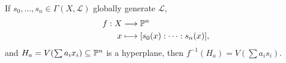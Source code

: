 \begin{remark}
  If $s_0, \dots, s_n \in
  \Gamma(X, \mathcal{L})$
  globally generate $\mathcal{L}$,
  \begin{align*}
    f : X &\longrightarrow \mathbb{P}^n \\
    x &\longmapsto [s_0(x) : \cdots : s_n(x)],
  \end{align*}
  and $H_a = V(\sum a_i x_i) \subseteq \mathbb{P}^n$ is a hyperplane,
  then $f^{-1}(H_a) = V(\sum a_i s_i)$.
\end{remark}
